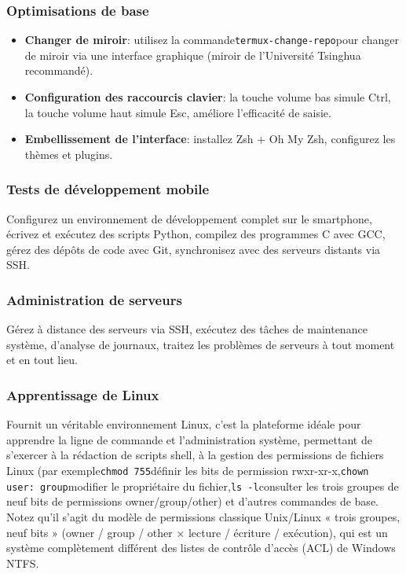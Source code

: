 \subsubsection*{Optimisations de base}

\begin{itemize}
  \item \textbf{Changer de miroir}: utilisez la commande\texttt{termux-\allowbreak change-\allowbreak repo}pour changer de miroir via une interface graphique (miroir de l'Université Tsinghua recommandé).
  \item \textbf{Configuration des raccourcis clavier}: la touche volume bas simule Ctrl, la touche volume haut simule Esc, améliore l'efficacité de saisie.
  \item \textbf{Embellissement de l'interface}: installez Zsh + Oh My Zsh, configurez les thèmes et plugins.
\end{itemize}


\subsubsection*{Tests de développement mobile}

Configurez un environnement de développement complet sur le smartphone, écrivez et exécutez des scripts Python, compilez des programmes C avec GCC, gérez des dépôts de code avec Git, synchronisez avec des serveurs distants via SSH.

\subsubsection*{Administration de serveurs}

Gérez à distance des serveurs via SSH, exécutez des tâches de maintenance système, d'analyse de journaux, traitez les problèmes de serveurs à tout moment et en tout lieu.

\subsubsection*{Apprentissage de Linux}

Fournit un véritable environnement Linux, c'est la plateforme idéale pour apprendre la ligne de commande et l'administration système, permettant de s'exercer à la rédaction de scripts shell, à la gestion des permissions de fichiers Linux (par exemple\texttt{chmod 755}définir les bits de permission rwxr-xr-x,\texttt{chown user: group}modifier le propriétaire du fichier,\texttt{ls -\allowbreak l}consulter les trois groupes de neuf bits de permissions owner/group/other) et d'autres commandes de base. Notez qu'il s'agit du modèle de permissions classique Unix/Linux « trois groupes, neuf bits » (owner / group / other × lecture / écriture / exécution), qui est un système complètement différent des listes de contrôle d'accès (ACL) de Windows NTFS.

